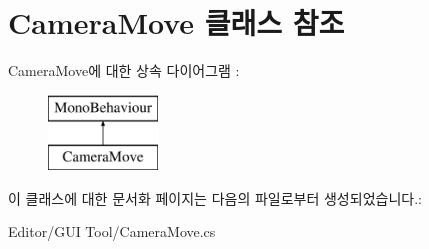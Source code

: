 \hypertarget{class_camera_move}{}\section{Camera\+Move 클래스 참조}
\label{class_camera_move}
Camera\+Move에 대한 상속 다이어그램 \+: \begin{figure}[H]
\begin{center}
\leavevmode
\includegraphics[height=2.000000cm]{class_camera_move}
\end{center}
\end{figure}


이 클래스에 대한 문서화 페이지는 다음의 파일로부터 생성되었습니다.\+:\begin{DoxyCompactItemize}
\item 
Editor/\+G\+U\+I Tool/Camera\+Move.\+cs\end{DoxyCompactItemize}
